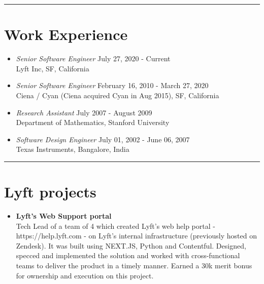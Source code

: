 \documentclass[line, 11pt]{res}
\renewenvironment{resume}{\begingroup}{\endgroup}
\begin{document}
\begin{resume}
\vspace{-5pt}
\hrule
\vspace{-7pt}

\section{Work Experience}
    \begin{itemize}
        \item{\sl Senior Software Engineer} \hfill July 27, 2020 - Current\\
        Lyft Inc, SF, California


        \item{\sl Senior Software Engineer} \hfill February 16, 2010 - March 27, 2020\\
        Ciena / Cyan (Ciena acquired Cyan in Aug 2015), SF, California

        \item{\sl Research Assistant} \hfill July 2007 - August 2009\\
        Department of Mathematics, Stanford University

        \item{\sl Software Design Engineer} \hfill July 01, 2002 - June 06, 2007\\
        Texas Instruments, Bangalore, India\\
    \end{itemize}

\hrule

\vspace{-7pt}
\section{Lyft projects}
    \begin{itemize}
        \item \textbf{Lyft's Web Support portal}\\
Tech Lead of a team of 4 which created Lyft's web help portal -  https://help.lyft.com - on Lyft's internal infrastructure (previously hosted on Zendesk). It was built using NEXT{\tiny.JS}, Python and Contentful. Designed, specced and implemented the solution and worked with cross-functional teams to deliver the product in a timely manner. Earned a 30k merit bonus for ownership and execution on this project.
    \end{itemize}


\end{resume}
\end{document}
